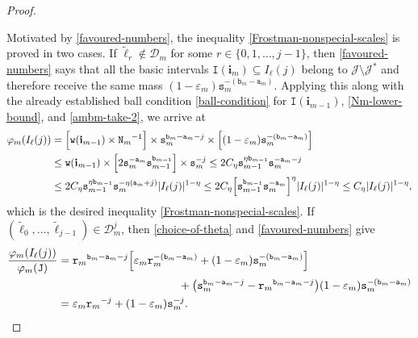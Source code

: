\documentclass[12pt, twoside]{article}
\theoremstyle{definition}
\numberwithin{equation}{section}
\begin{document}
\begin{proof}
\begin{itemize}
	\end{itemize} 
	Motivated by \eqref{favoured-numbers}, the inequality \eqref{Frostman-nonspecial-scales} is proved in two cases. If $\tilde{\ell}_r \notin \mathscr{D}_m$ for some $r \in \{0, 1, \ldots, j-1\}$, then \eqref{favoured-numbers} says that all the basic intervals $\mathtt I(\mathbf i_m) \subseteq I_{\ell}(j)$ belong to $\mathscr{J} \setminus \mathscr{J}^{\ast}$ and therefore receive the same mass $(1 - \varepsilon_m) \mathtt s_m^{-(\mathtt b_m - \mathtt a_m)}$. Applying this along with the already established ball condition \eqref{ball-condition} for $\mathtt I(\mathbf i_{m-1})$, \eqref{Nm-lower-bound}, and \eqref{ambm-take-2}, we arrive at
	\begin{align*} 
		\varphi_m(I_{\ell}(j)) &= \Bigl[{\mathtt w(\mathbf i_{m-1})} \times {\mathtt N_m}^{-1} \Bigr] \times \mathtt s_m^{\mathtt b_m - \mathtt a_m - j} \times \Bigl[(1 - \varepsilon_m) \mathtt s_m^{-(\mathtt b_m - \mathtt a_m)} \Bigr] \\ &\leq \mathtt w(\mathbf i_{m-1}) \times \Bigl[2 \mathtt s_m^{-\mathtt a_m} \mathtt s_{m-1}^{\mathtt b_{m-1}} \Bigr] \times \mathtt s_m^{-j} \leq 2C_{\eta} \mathtt s_{m-1}^{\eta \mathtt b_{m-1}} \mathtt s_m^{-\mathtt a_m - j} \\ &\leq 2C_{\eta} \mathtt s_{m-1}^{\eta \mathtt b_{m-1}} \mathtt s_m^{-\eta(\mathtt a_m + j)} |I_{\ell}(j)|^{1 - \eta} 
		\leq 2C_{\eta} \Bigl[\mathtt s_{m-1}^{\mathtt b_{m-1}} \mathtt s_{m}^{-\mathtt a_m} \Bigr]^{\eta} |I_{\ell}(j)|^{1 - \eta} \leq C_{\eta} |I_{\ell}(j)|^{1 - \eta}, 
	\end{align*} 
	which is the desired inequality \eqref{Frostman-nonspecial-scales}. If $(\tilde{\ell}_0, \ldots, \tilde{\ell}_{j-1}) \in \mathscr{D}_m^j$, then \eqref{choice-of-theta} and \eqref{favoured-numbers} give    
	\begin{align*} 
		\frac{\varphi_m(I_{\ell}(j))}{\varphi_m(\mathtt J)} &={\mathtt r_m}^{\mathtt b_m - \mathtt a_m - j} \Bigl[ \varepsilon_m \mathtt r_m^{-(\mathtt b_m - \mathtt a_m)} + (1 - \varepsilon_m) \mathtt s_m^{-(\mathtt b_m- \mathtt a_m)}\Bigr] \\ &\hskip1.5in + \bigl(\mathtt s_m^{\mathtt b_m - \mathtt a_m - j} - {\mathtt r_m}^{\mathtt b_m - \mathtt a_m - j} \bigr) (1 - \varepsilon_m) \mathtt s_m^{-(\mathtt b_m - \mathtt a_m)}   \\
		&= \varepsilon_m {\mathtt r_m}^{-j} + (1 - \varepsilon_m) \mathtt s_m^{-j}. %
	\end{align*} 

\end{proof}
\end{document}
